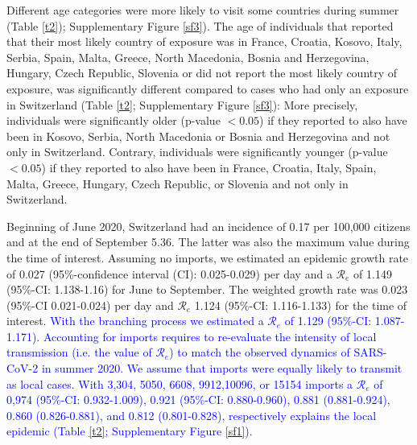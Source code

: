 \documentclass[10pt, a4paper, twoside]{article}
\begin{document}
\begin{multicols}{2}
Different age categories were more likely to visit some countries during summer (Table \ref{t2}); Supplementary Figure \ref{sf3}).
The age of individuals that reported that their most likely country of exposure was in France, Croatia, Kosovo, Italy, Serbia, Spain, Malta, Greece, North Macedonia, Bosnia and Herzegovina, Hungary, Czech Republic, Slovenia  or did not report the most likely country of exposure, was significantly different compared to cases who had only an exposure in Switzerland (Table \ref{t2}; Supplementary Figure \ref{sf3}):
More precisely, individuals were significantly older (p-value $<0.05$) if they reported to also have been in Kosovo, Serbia, North Macedonia or Bosnia and Herzegovina and not only in Switzerland.
Contrary, individuals were significantly younger (p-value $<0.05$) if they reported to also have been in France, Croatia, Italy, Spain, Malta, Greece, Hungary, Czech Republic, or Slovenia and not only in Switzerland.

Beginning of June 2020, Switzerland had an incidence of 0.17 per 100,000 citizens and at the end of September 5.36.
The latter was also the maximum value during the time of interest.
Assuming no imports, we estimated an epidemic growth rate of 0.027 (95\%-confidence interval (CI): 0.025-0.029) per day and a $\mathcal{R}_e$ of 1.149 (95\%-CI: 1.138-1.16) for June to September.
The weighted growth rate was 0.023 (95\%-CI 0.021-0.024) per day and $\mathcal{R}_e$ 1.124 (95\%-CI: 1.116-1.133) for the time of interest. %
\textcolor{blue}{With the branching process we estimated a $\mathcal{R}_e$ of 1.129 (95\%-CI: 1.087-1.171).
Accounting for imports requires to re-evaluate the intensity of local transmission (i.e. the value of $\mathcal{R}_e$) to match the observed dynamics of SARS-CoV-2 in summer 2020.
We assume that imports were equally likely to transmit as local cases.
With 3,304, 5050, 6608, 9912,10096, or 15154 imports a $\mathcal{R}_e$ of 0,974 (95\%-CI: 0.932-1.009),  0.921 (95\%-CI: 0.880-0.960), 0.881 (0.881-0.924), 0.860 (0.826-0.881), and 0.812 (0.801-0.828), respectively explains the local epidemic (Table \ref{t2}; Supplementary Figure \ref{sf1}).}


\end{multicols}
\end{document}
